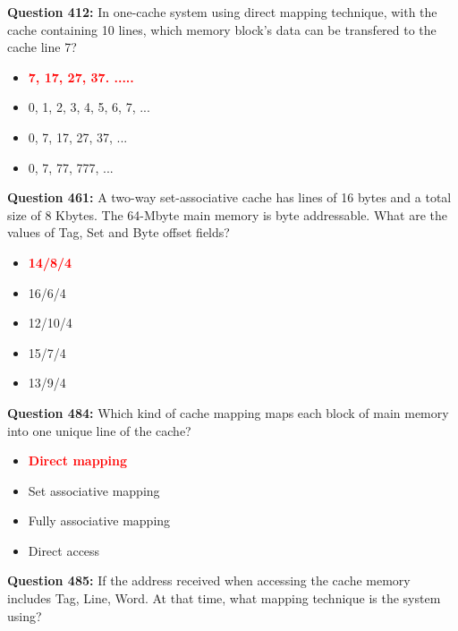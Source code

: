 \documentclass[12pt,a4paper]{article}
\begin{document}
\vspace{0.5cm}

\textbf{Question 412:} In one-cache system using direct mapping technique, with the cache containing 10 lines, which memory block's data can be transfered to the cache line 7?

\begin{itemize}
    \item[\textbf{A.}] \textcolor{red}{\textbf{7, 17, 27, 37. .....}}
    \item[\textbf{B.}] 0, 1, 2, 3, 4, 5, 6, 7, ...
    \item[\textbf{C.}] 0, 7, 17, 27, 37, ...
    \item[\textbf{D.}] 0, 7, 77, 777, ...
\end{itemize}

\vspace{0.5cm}

\textbf{Question 461:} A two-way set-associative cache has lines of 16 bytes and a total size of 8 Kbytes. The 64-Mbyte main memory is byte addressable. What are the values of Tag, Set and Byte offset fields?

\begin{itemize}
    \item[\textbf{A.}] \textcolor{red}{\textbf{14/8/4}}
    \item[\textbf{B.}] 16/6/4
    \item[\textbf{C.}] 12/10/4
    \item[\textbf{D.}] 15/7/4
    \item[\textbf{E.}] 13/9/4
\end{itemize}

\vspace{0.5cm}

\textbf{Question 484:} Which kind of cache mapping maps each block of main memory into one unique line of the cache?

\begin{itemize}
    \item[\textbf{A.}] \textcolor{red}{\textbf{Direct mapping}}
    \item[\textbf{B.}] Set associative mapping
    \item[\textbf{C.}] Fully associative mapping
    \item[\textbf{D.}] Direct access
\end{itemize}

\vspace{0.5cm}

\textbf{Question 485:} If the address received when accessing the cache memory includes Tag, Line, Word. At that time, what mapping technique is the system using?
\end{document}
